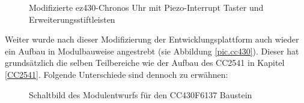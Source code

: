 \documentclass[12pt]{scrreprt} %
\begin{document}
\begin{figure}
\centering
{}
\caption[Modifizierte ez430-Chronos Uhr]{Modifizierte ez430-Chronos Uhr mit Piezo-Interrupt Taster und Erweiterungsstiftleisten}
\label{pic.breakout}
\end{figure}
Weiter wurde nach dieser Modifizierung der Entwicklungsplattform auch wieder ein Aufbau in Modulbauweise angestrebt (sie Abbildung \vref{pic.cc430}). Dieser hat grundsätzlich die selben Teilbereiche wie der Aufbau des CC2541 in Kapitel \vref{CC2541}. Folgende Unterschiede sind dennoch zu erwähnen:
\begin{figure}
\centering
{}
\caption[Schaltbild des Modulentwurfs, CC430F6137]{Schaltbild des Modulentwurfs für den CC430F6137 Baustein}
\label{pic.cc430}
\end{figure}
\end{document}
